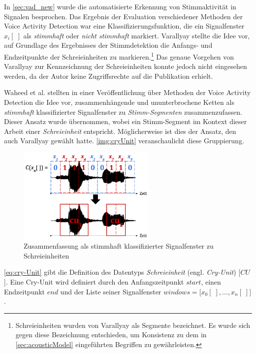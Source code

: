 In \autoref{sec:vad_new} wurde die automatisierte Erkennung von Stimmaktivität in Signalen besprochen. Das Ergebnis der Evaluation verschiedener Methoden der Voice Activity Detection war eine Klassifizierungsfunktion, die ein Signalfenster $x_i[\;]$ als \emph{stimmhaft} oder \emph{nicht stimmhaft} markiert. Varallyay \cite[S. 16 - 17]{cry_thesis} stellte die Idee vor, auf Grundlage des Ergebnisses der Stimmdetektion die Anfangs- und Endzeitpunkte der Schreieinheiten zu markieren.\footnote{\glqq Schreieinheiten\grqq{} wurden von Varallyay als \glqq Segmente\grqq{} bezeichnet. Es wurde sich gegen diese Bezeichnung entschieden, um Konsistenz zu dem in \autoref{sec:acousticModel} eingeführten Begriffen zu gewährleisten.} Das genaue Vorgehen von Varallyay zur Kennzeichnung der Schreieinheiten konnte jedoch nicht eingesehen werden, da der Autor keine Zugriffsrechte auf die Publikation erhielt.

Waheed et al. \cite{vad_entropy} stellten in einer Veröffentlichung über Methoden der Voice Activity Detection die Idee vor, zusammenhängende und ununterbrochene Ketten als \emph{stimmhaft} klassifizierter Signalfenster zu \emph{Stimm-Segmenten} zusammenzufassen. Dieser Ansatz wurde übernommen, wobei ein Stimm-Segment im Kontext dieser Arbeit einer \emph{Schreieinheit} entspricht. Möglicherweise ist dies der Ansatz, den auch  Varallyay \cite[S. 16 - 17]{cry_thesis} gewählt hatte. \autoref{img:cryUnit} veranschaulicht diese Gruppierung. 

\begin{figure}[h]
	\centering
	\includegraphics[width=0.6\textwidth]{bilder/cry-Unit02.png}
	\caption{Zusammenfassung als stimmhaft klassifizierter Signalfenster zu Schreieinheiten}
	\label{img:cryUnit}
\end{figure}

\autoref{eq:cry-Unit} gibt die Definition des Datentyps \emph{Schreieinheit} (engl. \emph{Cry-Unit}) [$CU$]. Eine Cry-Unit wird definiert durch den Anfangszeitpunkt $start$, einen Endzeitpunkt $end$ und der Liste seiner Signalfenster $windows = \big[x_0[\;], \ldots, x_n[\;]\big]$.

